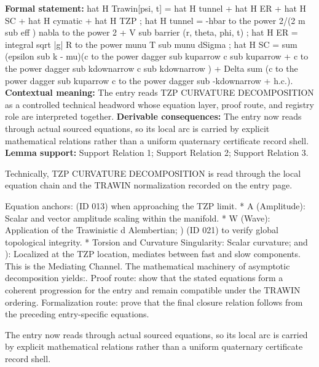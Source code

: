 \begingroup\footnotesize\setlength{\emergencystretch}{3em}\sloppy
\textbf{Formal statement:} hat H Trawin[psi, t] = hat H tunnel + hat H ER + hat H SC + hat H cymatic + hat H TZP ; hat H tunnel = -hbar to the power 2/(2 m sub eff ) nabla to the power 2 + V sub barrier (r, theta, phi, t) ; hat H ER = integral sqrt |g| R to the power munu T sub munu dSigma ; hat H SC = sum (epsilon sub k - mu)(c to the power dagger sub kuparrow c sub kuparrow + c to the power dagger sub kdownarrow c sub kdownarrow ) + Delta sum (c to the power dagger sub kuparrow c to the power dagger sub -kdownarrow + h.c.). \textbf{Contextual meaning:} The entry reads TZP CURVATURE DECOMPOSITION as a controlled technical headword whose equation layer, proof route, and registry role are interpreted together. \textbf{Derivable consequences:} The entry now reads through actual sourced equations, so its local arc is carried by explicit mathematical relations rather than a uniform quaternary certificate record shell. \textbf{Lemma support:} Support Relation 1; Support Relation 2; Support Relation 3.\par
\endgroup

Technically, TZP CURVATURE DECOMPOSITION is read through the local equation chain and the TRAWIN normalization recorded on the entry page.

Equation anchors: (ID 013) when approaching the TZP limit. * A (Amplitude): Scalar and vector amplitude scaling within the manifold. * W (Wave): Application of the Trawinistic d Alembertian; ) (ID 021) to verify global topological integrity. * Torsion and Curvature Singularity: Scalar curvature; and ): Localized at the TZP location, mediates between fast and slow components. This is the Mediating Channel. The mathematical machinery of asymptotic decomposition yields:. Proof route: show that the stated equations form a coherent progression for the entry and remain compatible under the TRAWIN ordering. Formalization route: prove that the final closure relation follows from the preceding entry-specific equations.

The entry now reads through actual sourced equations, so its local arc is carried by explicit mathematical relations rather than a uniform quaternary certificate record shell.
\endgroup

